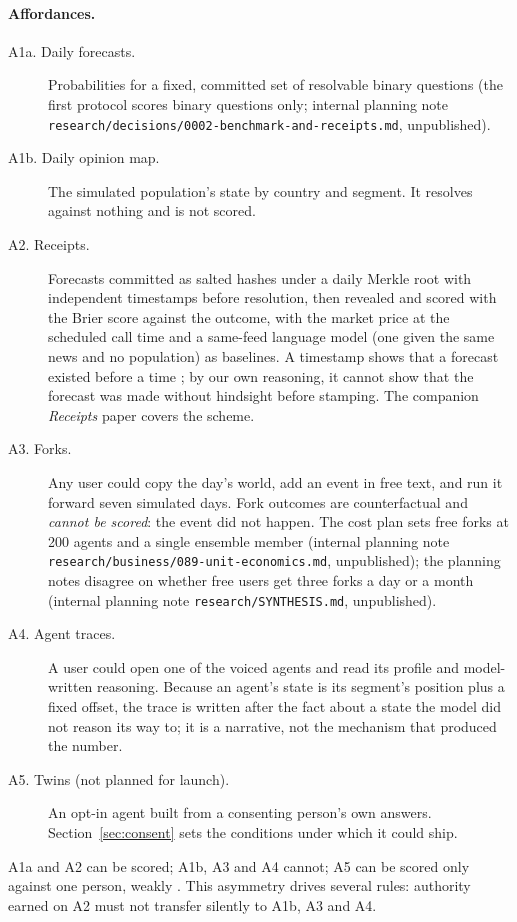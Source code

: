 \documentclass[11pt]{article}
\newcommand{\internal}[1]{internal planning note \nolinkurl{#1}, unpublished}
\begin{document}
\paragraph{Affordances.}
\begin{description}
  \item[A1a. Daily forecasts.] Probabilities for a fixed, committed set of resolvable binary questions (the first protocol scores binary questions only; \internal{research/decisions/0002-benchmark-and-receipts.md}).
  \item[A1b. Daily opinion map.] The simulated population's state by country and segment. It resolves against nothing and is not scored.
  \item[A2. Receipts.] Forecasts committed as salted hashes under a daily Merkle root with independent timestamps before resolution, then revealed and scored with the Brier score against the outcome, with the market price at the scheduled call time and a same-feed language model (one given the same news and no population) as baselines. A timestamp shows that a forecast existed before a time \citep{todd2016opentimestamps}; by our own reasoning, it cannot show that the forecast was made without hindsight before stamping. The companion \emph{Receipts} paper covers the scheme.
  \item[A3. Forks.] Any user could copy the day's world, add an event in free text, and run it forward seven simulated days. Fork outcomes are counterfactual and \emph{cannot be scored}: the event did not happen. The cost plan sets free forks at 200 agents and a single ensemble member (\internal{research/business/089-unit-economics.md}); the planning notes disagree on whether free users get three forks a day or a month (\internal{research/SYNTHESIS.md}).
  \item[A4. Agent traces.] A user could open one of the voiced agents and read its profile and model-written reasoning. Because an agent's state is its segment's position plus a fixed offset, the trace is written after the fact about a state the model did not reason its way to; it is a narrative, not the mechanism that produced the number.
  \item[A5. Twins (not planned for launch).] An opt-in agent built from a consenting person's own answers. Section~\ref{sec:consent} sets the conditions under which it could ship.
\end{description}

A1a and A2 can be scored; A1b, A3 and A4 cannot; A5 can be scored only against one person, weakly \citep{peng2025funhouse}. This asymmetry drives several rules: authority earned on A2 must not transfer silently to A1b, A3 and A4.
\end{document}
